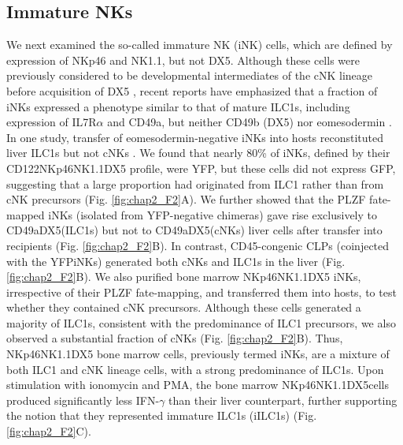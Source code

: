 \subsection{Immature NKs}

We next examined the so-called immature NK (iNK) cells, which are defined by expression of NKp46 and NK1.1, but not DX5. Although these cells were previously considered to be developmental intermediates of the cNK lineage before acquisition of DX5 \cite{yokoyama2004}, recent reports have emphasized that a fraction of iNKs expressed a phenotype similar to that of mature ILC1s, including expression of IL7R$\alpha$ and CD49a, but neither CD49b (DX5) nor eomesodermin \cite{sojka2014,klose2014,diefenbach2014}. In one study, transfer of eomesodermin-negative iNKs into \Ragrg hosts reconstituted liver ILC1s but not cNKs \cite{klose2014}. We found that nearly 80\% of iNKs, defined by their \CDte\UM CD122\UP NKp46\UP NK1.1\UP DX5\UM{} profile, were YFP\UP, but these cells did not express GFP, suggesting that a large proportion had originated from ILC1 rather than from cNK precursors (Fig. \ref{fig:chap2_F2}A). We further showed that the PLZF fate-mapped iNKs (isolated from YFP-negative chimeras) gave rise exclusively to CD49a\UP DX5\UM (ILC1s) but not to CD49a\UM DX5\UP (cNKs) liver cells after transfer into \Ragrg recipients (Fig. \ref{fig:chap2_F2}B). In contrast, CD45-congenic CLPs (coinjected with the YFP\UP iNKs) generated both cNKs and ILC1s in the liver (Fig. \ref{fig:chap2_F2}B). We also purified bone marrow \CDte\UM NKp46\UP NK1.1\UP DX5\UM{} iNKs, irrespective of their PLZF fate-mapping, and transferred them into \Ragrg hosts, to test whether they contained cNK precursors. Although these cells generated a majority of ILC1s, consistent with the predominance of ILC1 precursors, we also observed a substantial fraction of cNKs (Fig. \ref{fig:chap2_F2}B). Thus, \CDte\UM NKp46\UP NK1.1\UP DX5\UM{} bone marrow cells, previously termed iNKs, are a mixture of both ILC1 and cNK lineage cells, with a strong predominance of ILC1s. Upon stimulation with ionomycin and PMA, the bone marrow \CDte\UM NKp46\UP NK1.1\UP DX5\UM cells produced significantly less IFN-$\gamma$ than their liver counterpart, further supporting the notion that they represented immature ILC1s (iILC1s) (Fig. \ref{fig:chap2_F2}C).

